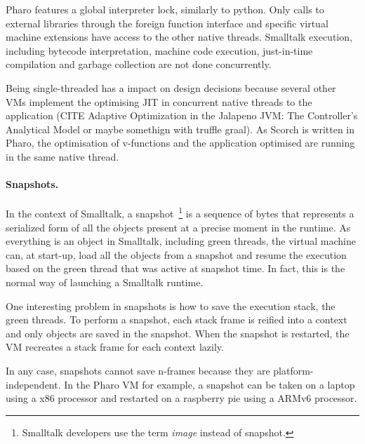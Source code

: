 \documentclass[a4paper,12pt,twoside]{../includes/ThesisStyle}
\begin{document}
Pharo features a global interpreter lock, similarly to python. Only calls to external libraries through the foreign function interface and specific virtual machine extensions have access to the other native threads. Smalltalk execution, including bytecode interpretation, machine code execution, just-in-time compilation and garbage collection are not done concurrently. 

Being single-threaded has a impact on design decisions because several other VMs implement the optimising JIT in concurrent native threads to the application (CITE Adaptive Optimization in the Jalapeno JVM: The Controller's Analytical Model or maybe somethign with truffle graal). As Scorch is written in Pharo, the optimisation of v-functions and the application optimised are running in the same native thread.


\paragraph{Snapshots.}

In the context of Smalltalk, a snapshot~\footnote{Smalltalk developers use the term \emph{image} instead of snapshot.} is a sequence of bytes that represents a serialized form of all the objects present at a precise moment in the runtime. As everything is an object in Smalltalk, including green threads, the virtual machine can, at start-up, load all the objects from a snapshot and resume the execution based on the green thread that was active at snapshot time. In fact, this is the normal way of launching a Smalltalk runtime. 

One interesting problem in snapshots is how to save the execution stack, \ie the green threads. To perform a snapshot, each stack frame is reified into a context and only objects are saved in the snapshot. When the snapshot is restarted, the VM recreates a stack frame for each context lazily. 

In any case, snapshots cannot save n-frames because they are platform-independent. In the Pharo VM for example, a snapshot can be taken on a laptop using a x86 processor and restarted on a raspberry pie using a ARMv6 processor.


\ifx\wholebook\relax\else
    
\end{document}
